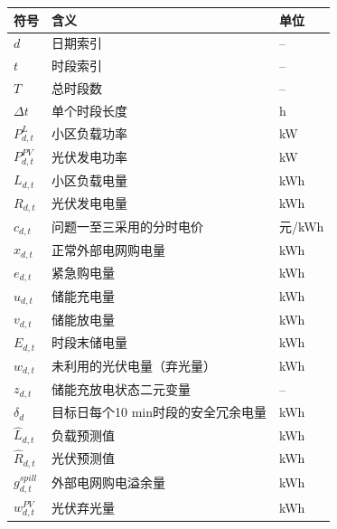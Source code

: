 \begin{center}
\begin{tabular}{p{}p{}p{}}
\hline
符号 & 含义 & 单位 \\
\hline
$d$ & 日期索引 & -- \\
$t$ & 时段索引 & -- \\
$T$ & 总时段数 & -- \\
$\Delta t$ & 单个时段长度 & h \\
$P_{d,t}^{L}$ & 小区负载功率 & kW \\
$P_{d,t}^{PV}$ & 光伏发电功率 & kW \\
$L_{d,t}$ & 小区负载电量 & kWh \\
$R_{d,t}$ & 光伏发电电量 & kWh \\
$c_{d,t}$ & 问题一至三采用的分时电价 & 元/kWh \\
$x_{d,t}$ & 正常外部电网购电量 & kWh \\
$e_{d,t}$ & 紧急购电量 & kWh \\
$u_{d,t}$ & 储能充电量 & kWh \\
$v_{d,t}$ & 储能放电量 & kWh \\
$E_{d,t}$ & 时段末储电量 & kWh \\
$w_{d,t}$ & 未利用的光伏电量（弃光量） & kWh \\
$z_{d,t}$ & 储能充放电状态二元变量 & -- \\
$\delta_d$ & 目标日每个10 min时段的安全冗余电量 & kWh \\
$\hat L_{d,t}$ & 负载预测值 & kWh \\
$\hat R_{d,t}$ & 光伏预测值 & kWh \\
$g_{d,t}^{spill}$ & 外部电网购电溢余量 & kWh \\
$w_{d,t}^{PV}$ & 光伏弃光量 & kWh \\
\hline
\end{tabular}
\end{center}
